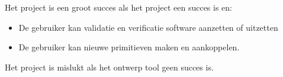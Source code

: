 Het project is een groot succes als het project een succes is en:

\begin{itemize}
 \item De gebruiker kan validatie en verificatie software aanzetten of uitzetten
 \item De gebruiker kan nieuwe primitieven maken en aankoppelen.
\end{itemize}

Het project is mislukt als het ontwerp tool geen succes is.
